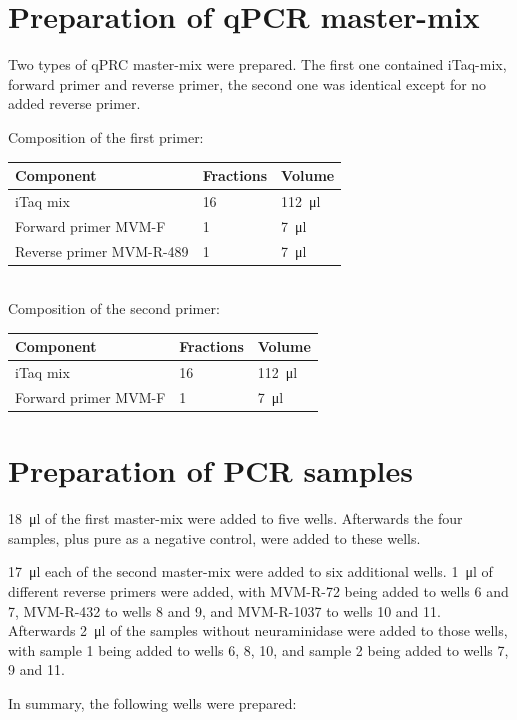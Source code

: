 \documentclass[a4paper,english]{scrreprt}
\begin{document}
\section{Preparation of qPCR master-mix}

Two types of qPRC master-mix were prepared. The first one contained iTaq-mix,
forward primer and reverse primer, the second one was identical except for no
added reverse primer.

Composition of the first primer:
\\

\begin{tabu}{lll}
	\toprule
	Component & Fractions & Volume \\
	\midrule
	iTaq mix & 16 & \SI{112}{\ul} \\
	Forward primer MVM-F & 1 & \SI{7}{\ul} \\
	Reverse primer MVM-R-489 & 1 & \SI{7}{\ul} \\
	\bottomrule
\end{tabu}
\\

Composition of the second primer:
\\

\begin{tabu}{lll}
	\toprule
	Component & Fractions & Volume \\
	\midrule
	iTaq mix & 16 & \SI{112}{\ul} \\
	Forward primer MVM-F & 1 & \SI{7}{\ul} \\
	\bottomrule
\end{tabu}

\section{Preparation of PCR samples}

\SI{18}{\ul} of the first master-mix were added to five wells. Afterwards the
four samples, plus pure  as a negative control, were added to these
wells.

\SI{17}{\ul} each of the second master-mix were added to six additional wells.
\SI{1}{\ul} of different reverse primers were added, with MVM-R-72 being added
to wells 6 and 7, MVM-R-432 to wells 8 and 9, and MVM-R-1037 to wells 10 and
11. Afterwards \SI{2}{\ul} of the samples without neuraminidase were added to
those wells, with sample 1 being added to wells 6, 8, 10, and sample 2 being
added to wells 7, 9 and 11.

In summary, the following wells were prepared:
\\
\end{document}
